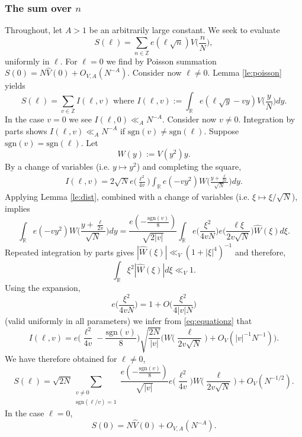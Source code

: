 \documentclass[12pt,reqno]{amsart}
\theoremstyle{plain}
\numberwithin{equation}{section}
\numberwithin{figure}{section}
\theoremstyle{plain}
\theoremstyle{definition}
\theoremstyle{remark}
\begin{document}
    \subsubsection{The sum over $n$}    
    Throughout, let $A>1$ be an arbitrarily large constant. 
    We seek to evaluate
    $$
    S(\ell) = \sum_{n \in \mathbb{Z}} e(\ell \sqrt{n}) V \Big ( \frac{n}{N} \Big ),
    $$
    uniformly in $\ell$. 
    For $\ell = 0$ we find by Poisson summation
    $
    S(0) = N \widehat{V}(0) + 
    O_{V, A}(N^{-A}).
    $
    Consider now $\ell \neq 0$. Lemma \ref{le:poisson} yields
    $$
    S(\ell) = \sum_{v \in \mathbb{Z}} I(\ell, v)
    \,\, \mathrm{where} \,\,
    I(\ell,v):=\int_{\mathbb{R}} e(\ell \sqrt{y} - v y) V \Big ( \frac{y}{N} \Big ) dy. 
    $$
    In the case $v = 0$ we see $I(\ell, 0) \ll_{A} N^{-A}$. 
    Consider now $v\neq 0$. Integration by parts shows 
    $I(\ell,v) \ll_{A} N^{-A}$ if 
    $\mathrm{sgn}(v) \neq \mathrm{sgn}(\ell)$.
    Suppose $\mathrm{sgn}(v) = \mathrm{sgn}(\ell)$.  
    Let $$
    W(y) := V(y^2) y.
    $$
    By a change of variables (i.e. $y \mapsto y^2$) and completing the square,
    \begin{align} \label{eq:equation}
      I(\ell,v)
      = 2 \sqrt{N} e \Big ( \frac{\ell^2}{4 v} \Big ) 
      \int_{\mathbb{R}} e(- v y^2) W \Big ( \frac{y + \frac{\ell}{2 v}}{\sqrt{N}} \Big ) d y.
    \end{align}
    Applying Lemma \ref{le:dist}, 
    combined with a change of variables
    (i.e. $\xi \mapsto \xi/\sqrt{N}$), implies
    \begin{equation} \label{eq:equationz}
    \int_{\mathbb{R}} e(- v y^2) 
    W \Big ( \frac{y + \frac{\ell}{2 v}}{\sqrt{N}} \Big ) dy 
    =  \frac{e(-\tfrac {\text{sgn}(v)}{8})}{\sqrt{2 |v|}} 
    \int_{\mathbb{R}} e \Big ( \frac{\xi^2}{4 v N} \Big ) 
    e \Big ( \frac{\ell \xi}{2 v \sqrt{N}} \Big ) \widehat{W}(\xi) d \xi.
    \end{equation}
    Repeated integration by parts gives $|\widehat{W}(\xi)| \ll_{V} (1 + |\xi|^4)^{-1}$
    and therefore, 
    $$
     \int_{\mathbb{R}} \xi^2 |\widehat{W}(\xi)| d \xi
     \ll_{V} 1.
    $$
     Using the expansion,
     $$
     e \Big ( \frac{\xi^2}{4 v N} \Big ) = 1 + O \Big ( \frac{\xi^2}{4 |v| N} \Big )
     $$
     (valid uniformly in all parameters)
     we infer from \eqref{eq:equationz} that
\begin{equation} 
I(\ell,v) =  
e \Big (\frac{\ell^2}{4 v} - \frac{\text{sgn}(v)}{8} \Big ) 
\sqrt{\frac{2 N}{|v|}} 
\Big ( W \Big ( \frac{\ell}{2 v \sqrt{N}} \Big ) + O_{V}(|v|^{-1} N^{-1} ) \Big ) .
\end{equation} 
We have therefore obtained for $\ell \neq 0$,
$$
S(\ell) = \sqrt{2 N} 
\sum_{\substack{v \neq 0 \\ \text{sgn}(\ell / v) = 1}} 
\frac{e(- \tfrac{\mathrm{sgn}(v)}{8})}{\sqrt{|v|}} 
e \Big( \frac{\ell^2}{4 v} \Big)
W \Big ( \frac{\ell}{2 v \sqrt{N}} \Big ) + 
O_{V} (N^{-1/2}).
$$
In the case $\ell = 0$,
$$
S(0) = N \widehat{V}(0) + O_{V,A}(N^{-A}).
$$
\end{document}
